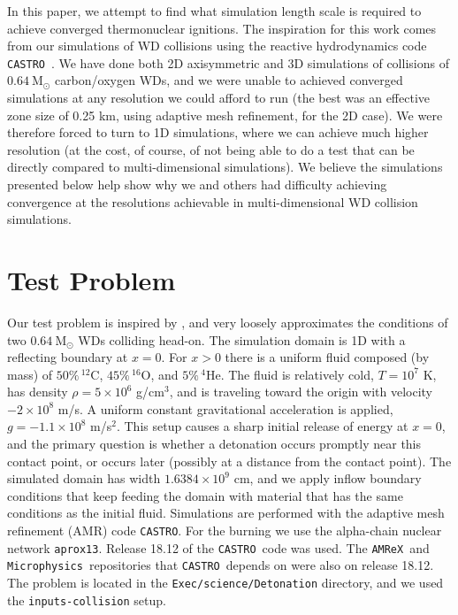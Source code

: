 \documentclass[twocolumn,numberedappendix,trackchanges]{../aastex62}
\newcommand{\msolar}{\mathrm{M}_\odot}
\newcommand{\amrex}{\texttt{AMReX}}
\newcommand{\castro}{\texttt{CASTRO}}
\newcommand{\microphysics}{\texttt{Microphysics}}
\begin{document}
In this paper, we attempt to find what simulation length scale is required to achieve
converged thermonuclear ignitions. The inspiration for this work comes from our
simulations of WD collisions using the reactive hydrodynamics code \castro\
\citep{castro, astronum:2017}. We have done both 2D axisymmetric and 3D simulations
of collisions of $0.64\ \msolar$ carbon/oxygen WDs, and we were unable to achieved converged
simulations at any resolution we could afford to run (the best was an effective zone size of
0.25 km, using adaptive mesh refinement, for the 2D case). We were therefore forced to
turn to 1D simulations, where we can achieve much higher resolution (at the cost, of course,
of not being able to do a test that can be directly compared to multi-dimensional simulations).
We believe the simulations presented below help show why we and others had difficulty
achieving convergence at the resolutions achievable in multi-dimensional WD collision simulations.



\section{Test Problem}
\label{sec:collisions}

Our test problem is inspired by \cite{kushnir:2013}, and very loosely approximates the
conditions of two $0.64\ \msolar$ WDs colliding head-on. The simulation domain is 1D with a
reflecting boundary at $x = 0$. For $x > 0$ there is a uniform fluid composed (by mass)
of $50\%\, ^{12}$C, $45\%\, ^{16}$O, and $5\%\, ^{4}$He. The fluid is relatively cold,
$T = 10^7$ K, has density $\rho = 5 \times 10^6$ g/cm$^3$, and is traveling toward the
origin with velocity $-2 \times 10^8$ m/s. A uniform constant gravitational acceleration
is applied, $g = -1.1 \times 10^8$ m/s$^{2}$. This setup causes a sharp initial release
of energy at $x = 0$, and the primary question is whether a detonation occurs promptly
near this contact point, or occurs later (possibly at a distance from the contact point).
The simulated domain has width $1.6384 \times 10^9$ cm, and we apply inflow boundary conditions
that keep feeding the domain with material that has the same conditions as the initial fluid.
Simulations are performed with the adaptive mesh refinement (AMR) code \castro.
For the burning we use the alpha-chain nuclear network \texttt{aprox13}.
Release 18.12 of the \castro\ code was used. The \amrex\ and \microphysics\ repositories
that \castro\ depends on were also on release 18.12. The problem is located in the
\texttt{Exec/science/Detonation} directory, and we used the \texttt{inputs-collision} setup.
\end{document}
